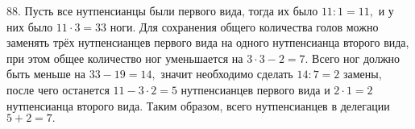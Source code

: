 88. Пусть все нутпенсианцы были первого вида, тогда их было $11:1=11,$ и у них было $11\cdot3=33$ ноги. Для сохранения общего количества голов можно заменять трёх нутпенсианцев первого вида на одного нутпенсианца второго вида, при этом общее количество ног уменьшается на $3\cdot3-2=7.$ Всего ног должно быть меньше на  $33-19=14,$ значит необходимо сделать $14:7=2$ замены, после чего останется $11-3\cdot2=5$ нутпенсианцев первого вида и $2\cdot1=2$ нутпенсианца второго вида. Таким образом, всего нутпенсианцев в делегации $5+2=7.$\\
